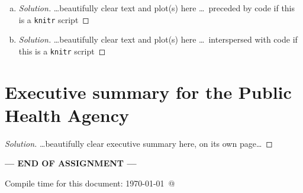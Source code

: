 \documentclass[12pt]{article}
\begin{document}
\begin{enumerate}[(a)]
\begin{itemize}
\begin{Schunk}
\begin{Sinput}
> ## Plot solutions of the SI model
> tmax <- 10 # end time for numerical integration of the ODE
> ## draw box for plot:
> plot(0,0,xlim=c(0,tmax),ylim=c(0,1),
+      type="n",xlab="Time (t)",ylab="Prevalence (I)",las=1)
> ## initial conditions:
> I0 <- 0.001
> S0 <- 1 - I0
> ## draw solutions for several values of parameter beta:
> betavals <- c(1.5,2,2.5)
> for (i in 1:length(betavals)) {
+   draw.soln(ic=c(x=S0,y=I0), tmax=tmax,
+             func=SI.vector.field,
+             parms=c(beta=betavals[i],gamma=1),
+             lty=i # use a different line style for each solution
+             )
+ }
\end{Sinput}
\end{Schunk}


  \end{itemize}
 
 {\color{blue} \begin{proof}[Solution]
 {\color{magenta}\dots If this is a \texttt{knitr} script then your code should be displayed here.  Otherwise, you should state here the name of the file where the \Rlogo code is, and the names of any functions you defined\dots}
 \end{proof}
 }

\item \FitSIRc

  {\color{blue} \begin{proof}[Solution]
  {\color{magenta}\dots beautifully clear text and plot(s) here \dots\ preceded by \Rlogo code if this is a \texttt{knitr} script}
  \end{proof}
  }
  
\item \FitSIRd

  {\color{blue} \begin{proof}[Solution]
  {\color{magenta}\dots beautifully clear text and plot(s) here \dots\ interspersed with \Rlogo code if this is a \texttt{knitr} script}
  \end{proof}
  }
 
\end{enumerate}

\section{Executive summary for the Public Health Agency}

\ExecSumm

  {\color{blue} \begin{proof}[Solution]
  {\color{magenta}\dots beautifully clear executive summary here, on its own page\dots}
  \end{proof}
  }

\bigskip

\centerline{\bf--- END OF ASSIGNMENT ---}

\bigskip
Compile time for this document:
\today\ @ \thistime
\end{document}
